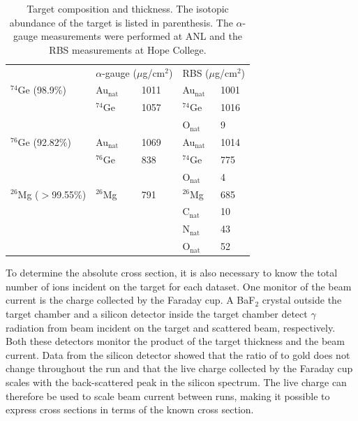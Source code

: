 \begin{table}[htp]
\centering
\begin{tabular}{lllll}
 & \multicolumn{2}{c}{$\alpha$-gauge ($\mu$g/cm$^2$)} & \multicolumn{2}{c}{RBS ($\mu$g/cm$^2$)} \\
\cline{2-3}\cline{4-5}
$^{74}$Ge (98.9\%) & Au$_{\text{nat}}$ & 1011 & Au$_{\text{nat}}$ & 1001 \\
          & $^{74}$Ge & 1057 & $^{74}$Ge & 1016 \\
          &           &      & O$_{\text{nat}}$ & 9 \\[0.35cm]

$^{76}$Ge (92.82\%) & Au$_{\text{nat}}$ & 1069 & Au$_{\text{nat}}$ & 1014 \\
          & $^{76}$Ge & 838 & $^{74}$Ge & 775 \\
          &           &      & O$_{\text{nat}}$ & 4 \\[0.35cm]

$^{26}$Mg ($>$99.55\%) & $^{26}$Mg & 791 & $^{26}$Mg & 685 \\
          &           &      & C$_{\text{nat}}$ & 10 \\
          &           &      & N$_{\text{nat}}$ & 43 \\
          &           &      & O$_{\text{nat}}$ & 52 \\
\end{tabular}
\caption{Target composition and thickness.  The isotopic abundance of the target is listed in parenthesis.  The $\alpha$-gauge measurements were performed at ANL and the RBS measurements at Hope College.}
\label{tab:targets}
\end{table}

To determine the absolute cross section, it is also necessary to know the total number of  ions incident on the target for each dataset.  One monitor of the beam current is the charge collected by the Faraday cup.  A BaF$_2$ crystal outside the target chamber and a silicon detector inside the target chamber detect $\gamma$ radiation from beam incident on the target and scattered  beam, respectively.  Both these detectors monitor the product of the target thickness and the beam current.  Data from the silicon detector showed that the ratio of \GeTargets to gold does not change throughout the run and that the live charge collected by the Faraday cup scales with the back-scattered peak in the silicon spectrum.  The live charge can therefore be used to scale beam current between runs, making it possible to express \reaction cross sections in terms of the known \MgReaction cross section.

